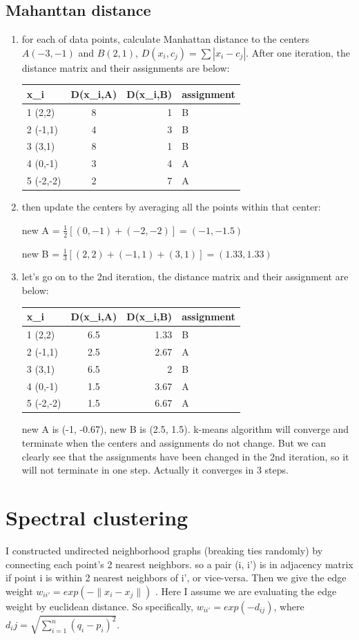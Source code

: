 \documentclass{article}
\begin{document}
\subsection{Mahanttan distance}
\begin{enumerate}
\item
for each of data points, calculate Manhattan distance to the centers $A (-3,-1)$ and $B(2,1)$, $D(x_i, c_j) = \sum |x_i - c_j| $. After one iteration, the distance matrix and their assignments are below:

\medskip
\begin{tabular}{l|c|r|b}
x_i & D(x_i,A) & D(x_i,B) & assignment\\
\hline
1 (2,2)& 8 & 1 & B\\
2 (-1,1)& 4 & 3 &B\\
3 (3,1)& 8 & 1 & B\\
4 (0,-1) &3&4 & A\\
5 (-2,-2) &2&7 & A
\end{tabular}

\item
then update the centers by averaging all the points within that center: 

new A = $\frac{1}{2} [(0,-1) + (-2,-2)] = (-1, -1.5)$

new B = $\frac{1}{3} [(2,2) + (-1,1) + (3,1)] = (1.33, 1.33)$

\medskip
\item
let's go on to the 2nd iteration, the distance matrix and their assignment are below:

\medskip
\begin{tabular}{l|c|r|b}
x_i & D(x_i,A) & D(x_i,B) & assignment\\
\hline
1 (2,2)& 6.5 & 1.33 & B\\
2 (-1,1)& 2.5 & 2.67 & A\\
3 (3,1)& 6.5 & 2 & B\\
4 (0,-1) & 1.5 & 3.67 & A\\
5 (-2,-2) & 1.5 & 6.67 & A
\end{tabular}

\medskip
new A is (-1, -0.67), new B is (2.5, 1.5). k-means algorithm will converge and terminate when the centers and assignments do not change. But we can clearly see that the assignments have been changed in the 2nd iteration, so it will not terminate in one step. Actually it converges in 3 steps.
\end{enumerate}

\section{Spectral clustering}
I constructed undirected neighborhood graphs (breaking ties randomly) by connecting each point's 2 nearest neighbors. so a pair (i, i') is in adjacency matrix if point i is within 2 nearest neighbors of i', or vice-versa. Then we give the edge weight $w_{ii'} = exp(-\|x_i - x_j\|)$ . Here I assume we are evaluating the edge weight by euclidean distance. So specifically, $w_{ii'} = exp(-d_{ij})$, where $d_ij = \sqrt {\sum _{i=1}^{n}(q_{i}-p_{i})^{2}}$. 
\end{document}
